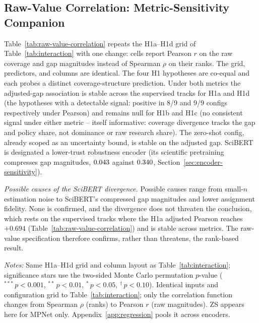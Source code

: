 \documentclass[12pt,a4paper]{article}
\begin{document}
\subsection{Raw-Value Correlation: Metric-Sensitivity Companion}
\label{app:raw-value-correlation}

Table~\ref{tab:raw-value-correlation} repeats the H1a--H1d grid of Table~\ref{tab:interaction}
with one change: cells report Pearson $r$ on the raw coverage and gap magnitudes instead of
Spearman $\rho$ on their ranks. The grid, predictors, and columns are identical. The four
H1 hypotheses are co-equal and each probes a distinct coverage-structure prediction. Under
both metrics the adjusted-gap association is stable across the supervised tracks for H1a
and H1d (the hypotheses with a detectable signal: positive in 8/9 and 9/9 configs
respectively under Pearson) and remains null for H1b and H1c (no consistent signal under
either metric -- itself informative: coverage divergence tracks the gap and policy share,
not dominance or raw research share). The
zero-shot config, already scoped as an uncertainty bound, is stable on the adjusted gap.
SciBERT is designated a lower-trust robustness encoder (its scientific pretraining
compresses gap magnitudes, $0.043{}$ against $0.340{}$,
Section~\ref{sec:encoder-sensitivity}).

\emph{Possible causes of the SciBERT divergence.} Possible causes range from small-$n$ estimation noise to SciBERT's compressed gap magnitudes and lower assignment fidelity. None is confirmed, and the divergence does not threaten the conclusion, which rests on the supervised tracks where the H1a adjusted Pearson reaches $+0.694$ (Table~\ref{tab:raw-value-correlation}) and is stable across metrics. The raw-value specification therefore confirms, rather than threatens, the rank-based result.

\begin{table}[htbp]
\centering
\small
\caption{Pearson $r$ on the raw coverage and semantic-gap magnitudes (not ranked).}
\label{tab:raw-value-correlation}

\par\smallskip\footnotesize\emph{Notes:} Same H1a--H1d grid and column layout as Table~\ref{tab:interaction}; significance stars use the two-sided Monte Carlo permutation $p$-value ($^{***}\,p<0.001$, $^{**}\,p<0.01$, $^{*}\,p<0.05$, $^{\dagger}\,p<0.10$). Identical inputs and configuration grid to
Table~\ref{tab:interaction}; only the correlation function changes from Spearman
$\rho$ (ranks) to Pearson $r$ (raw magnitudes). ZS appears here for MPNet only. Appendix~\ref{app:regression} pools it across encoders.\par
\end{table}
\end{document}
